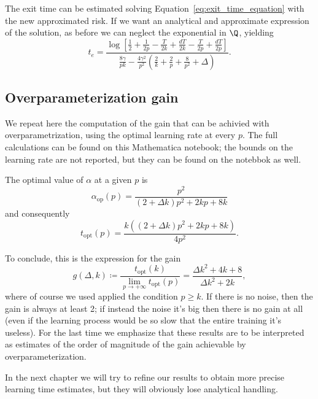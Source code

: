 The exit time can be estimated solving Equation~\eqref{eq:exit_time_equation} with the new approximated risk.
If we want an analytical and approximate expression of the solution,
as before we can neglect the exponential in \(\Q\), yielding
\[t_e = \frac{\log \left[\frac12 + \frac{1}{2p} - \frac{T}{2k} + \frac{dT}{2k} - \frac{T}{2p} + \frac{dT}{2p} \right]}
             {\frac{8 \gamma}{pk} -\frac{4 \gamma^2}{p^2} \left(\frac2k +\frac{2}{p} + \frac{8}{p^2} + \Delta \right)}.
\]

\subsection{Overparameterization gain}
We repeat here the computation of the gain that can be achivied with overparametrization,
using the optimal learning rate at every \(p\).
The full calculations can be found on this Mathematica notebook; 
the bounds on the learning rate are not reported, but they can be found on the notebbok as well.

The optimal value of \(\alpha\) at a given \(p\) is
\[
  \alpha_\text{op}(p) = \frac{p^2}{(2+\Delta k) p^2+2 k p+8 k}
\]
and consequently
\[
  t_\text{opt}{(p)} = \frac{k \left((2+\Delta k) p^2+2 k p+8 k\right)}{4 p^2}.
\]

To conclude, this is the expression for the gain
\[
  g{(\Delta, k)} \coloneqq \frac{t_\text{opt}{(k)}}{\lim_{p\to+\infty}t_\text{opt}{(p)}} =
    \frac{\Delta k^2 + 4k + 8}{\Delta k^2 + 2k},
\]
where of course we used applied the condition \(p\ge k\).
If there is no noise, then the gain is always at least 2; 
if instead the noise it's big then there is no gain at all (even if the learning process would be so slow that the entire training it's useless).
For the last time we emphasize that these results are to be interpreted as estimates of the order of magnitude of the gain achievable by overparameterization.

In the next chapter we will try to refine our results to obtain more precise learning time estimates, but they will obviously lose analytical handling.